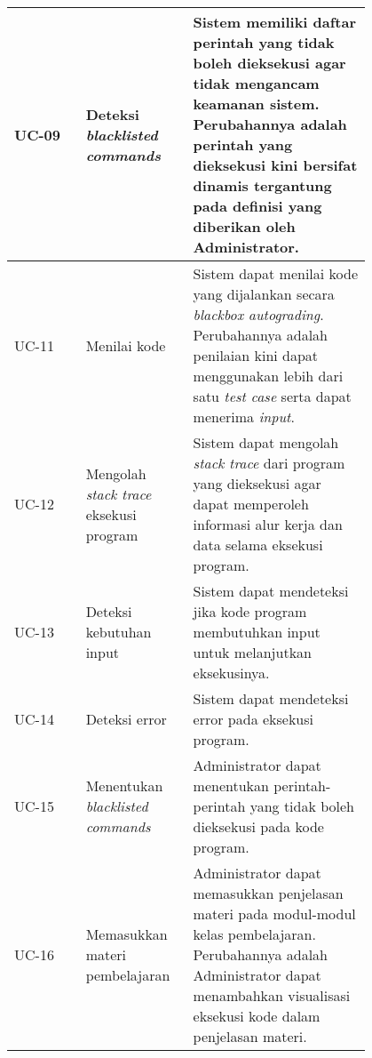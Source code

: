 \begin{longtable}[c]{|l|>{\setlength{\baselineskip}{0.75\baselineskip}}p{0.3\linewidth}|>{\setlength{\baselineskip}{0.75\baselineskip}}p{0.5\linewidth}|}
  UC-09       & Deteksi \textit{blacklisted commands}          & Sistem memiliki daftar perintah yang tidak boleh dieksekusi agar tidak mengancam keamanan sistem. Perubahannya adalah perintah yang dieksekusi kini bersifat dinamis tergantung pada definisi yang diberikan oleh Administrator.                                                    \\ \hline
  UC-11       & Menilai kode                                   & Sistem dapat menilai kode yang dijalankan secara \textit{blackbox autograding}. Perubahannya adalah penilaian kini dapat menggunakan lebih dari satu \textit{test case} serta dapat menerima \textit{input}.                                                                        \\ \hline
  UC-12       & Mengolah \textit{stack trace} eksekusi program & Sistem dapat mengolah \textit{stack trace} dari program yang dieksekusi agar dapat memperoleh informasi alur kerja dan data selama eksekusi program.                                                                                                                                \\ \hline
  UC-13       & Deteksi kebutuhan input                        & Sistem dapat mendeteksi jika kode program membutuhkan input untuk melanjutkan eksekusinya.                                                                                                                                                                                          \\ \hline
  UC-14       & Deteksi error                                  & Sistem dapat mendeteksi error pada eksekusi program.                                                                                                                                                                                                                                \\ \hline
  UC-15       & Menentukan \textit{blacklisted commands}       & Administrator dapat menentukan perintah-perintah yang tidak boleh dieksekusi pada kode program.                                                                                                                                                                                     \\ \hline
  UC-16       & Memasukkan materi pembelajaran                 & Administrator dapat memasukkan penjelasan materi pada modul-modul kelas pembelajaran. Perubahannya adalah Administrator dapat menambahkan visualisasi eksekusi kode dalam penjelasan materi.                                                                                        \\ \hline

\end{longtable}

